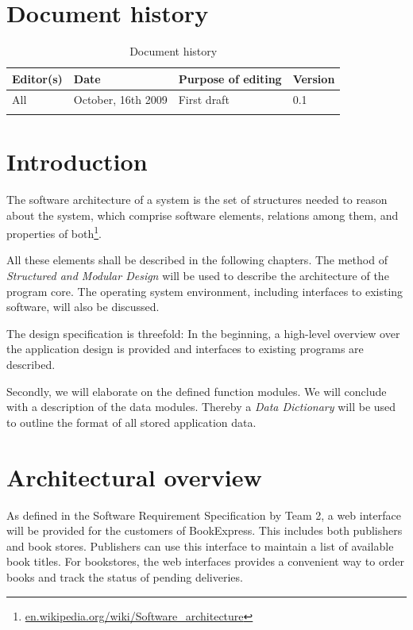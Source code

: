 


\maketitle
\newpage
\tableofcontents
\newpage
\listoftables
\newpage

\setcounter{page}{4}

\chapter{Document history}
\begin{longtable}[c]{|p{}|p{}|p{}|p{}|}
\hline
Editor(s) & Date & Purpose of editing & Version\\
\hline
\hline
All & October, 16th 2009 & First draft & 0.1 \\
\hline
\caption{Document history}
\end{longtable}
\newpage
\chapter{Introduction}
The software architecture of a system is the set of structures needed to reason about the system, which comprise software elements, relations among them, and properties of both\footnote{\href{en.wikipedia.org/wiki/Software_architecture}{en.wikipedia.org/wiki/Software\_architecture}}.

All these elements shall be described in the following chapters. The method of \emph{Structured and Modular Design} will be used to describe the architecture of the program core. The operating system environment, including interfaces to existing software, will also be discussed.

The design specification is threefold: In the beginning, a high-level overview over the application design is provided and interfaces to existing programs are described.

Secondly, we will elaborate on the defined function modules. We will conclude with a description of the data modules. Thereby a \emph{Data Dictionary} will be used to outline the format of all stored application data.
\newpage
\chapter{Architectural overview}
As defined in the Software Requirement Specification by Team 2, a web interface will be provided for the customers of BookExpress. This includes both publishers and book stores. Publishers can use this interface to maintain a list of available book titles. For bookstores, the web interfaces provides a convenient way to order books and track the status of pending deliveries.

